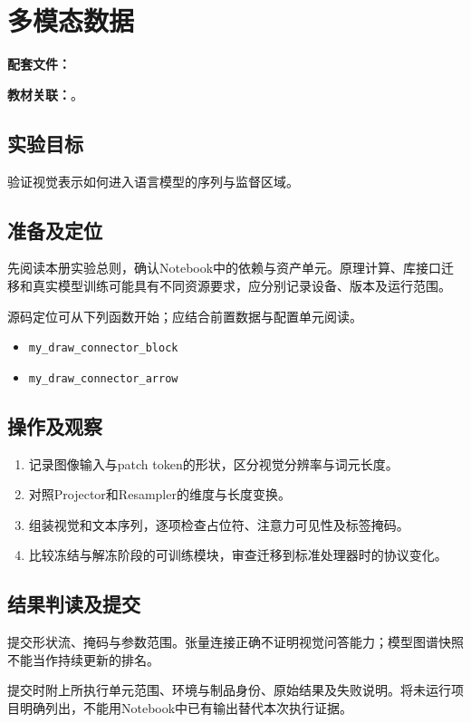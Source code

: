 \chapter{多模态数据}
\label{lab:E20_multimodal_llm}

\noindent\textbf{配套文件：}\par
\noindent\textbf{教材关联：}。

\section*{实验目标}
验证视觉表示如何进入语言模型的序列与监督区域。

\section*{准备及定位}
先阅读本册实验总则，确认Notebook中的依赖与资产单元。原理计算、库接口迁移和真实模型训练可能具有不同资源要求，应分别记录设备、版本及运行范围。

源码定位可从下列函数开始；应结合前置数据与配置单元阅读。
\begin{itemize}
\item \texttt{my\_draw\_connector\_block}
\item \texttt{my\_draw\_connector\_arrow}
\end{itemize}

\section*{操作及观察}
\begin{enumerate}
\item 记录图像输入与patch token的形状，区分视觉分辨率与词元长度。
\item 对照Projector和Resampler的维度与长度变换。
\item 组装视觉和文本序列，逐项检查占位符、注意力可见性及标签掩码。
\item 比较冻结与解冻阶段的可训练模块，审查迁移到标准处理器时的协议变化。
\end{enumerate}

\section*{结果判读及提交}
提交形状流、掩码与参数范围。张量连接正确不证明视觉问答能力；模型图谱快照不能当作持续更新的排名。

提交时附上所执行单元范围、环境与制品身份、原始结果及失败说明。将未运行项目明确列出，不能用Notebook中已有输出替代本次执行证据。
